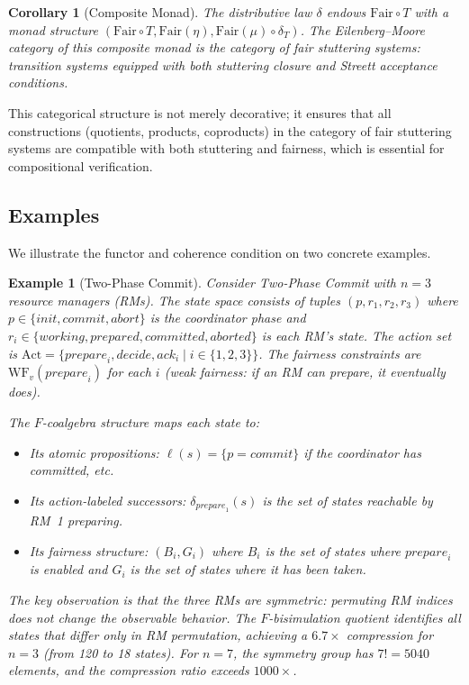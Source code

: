 \documentclass[11pt]{article}
\newtheorem{corollary}[theorem]{Corollary}
\newtheorem{example}[theorem]{Example}
\newcommand{\Fair}{\ensuremath{\mathrm{Fair}}}
\newcommand{\Act}{\ensuremath{\mathrm{Act}}}
\newcommand{\WF}{\ensuremath{\mathrm{WF}}}
\begin{document}
\begin{corollary}[Composite Monad]
\label{cor:composite}
The distributive law $\delta$ endows $\Fair \circ T$ with a monad structure
$(\Fair \circ T, \Fair(\eta), \Fair(\mu) \circ \delta_T)$.
The Eilenberg--Moore category of this composite monad is the category of
\emph{fair stuttering systems}: transition systems equipped with both
stuttering closure and Streett acceptance conditions.
\end{corollary}

This categorical structure is not merely decorative; it ensures that all
constructions (quotients, products, coproducts) in the category of fair
stuttering systems are compatible with both stuttering and fairness, which
is essential for compositional verification.


\subsection{Examples}

We illustrate the functor and coherence condition on two concrete examples.

\begin{example}[Two-Phase Commit]
\label{ex:2pc}
Consider Two-Phase Commit with $n = 3$ resource managers (RMs).
The state space consists of tuples $(p, r_1, r_2, r_3)$ where
$p \in \{\mathit{init}, \mathit{commit}, \mathit{abort}\}$ is the
coordinator phase and $r_i \in \{\mathit{working}, \mathit{prepared},
\mathit{committed}, \mathit{aborted}\}$ is each RM's state.
The action set is $\Act = \{\mathit{prepare}_i, \mathit{decide},
\mathit{ack}_i \mid i \in \{1,2,3\}\}$.
The fairness constraints are $\WF_v(\mathit{prepare}_i)$ for each $i$
(weak fairness: if an RM can prepare, it eventually does).

The $F$-coalgebra structure maps each state to:
\begin{itemize}[nosep]
\item Its atomic propositions: $\ell(s) = \{p = \mathit{commit}\}$ if the
  coordinator has committed, etc.
\item Its action-labeled successors: $\delta_{\mathit{prepare}_1}(s)$ is the
  set of states reachable by RM~1 preparing.
\item Its fairness structure: $(B_i, G_i)$ where $B_i$ is the set of states
  where $\mathit{prepare}_i$ is enabled and $G_i$ is the set of states
  where it has been taken.
\end{itemize}

The key observation is that the three RMs are \emph{symmetric}: permuting
RM indices does not change the observable behavior.
The $F$-bisimulation quotient identifies all states that differ only in
RM permutation, achieving a $6.7\times$ compression for $n = 3$
(from 120 to 18 states).
For $n = 7$, the symmetry group has $7! = 5040$ elements, and the
compression ratio exceeds $1000\times$.
\end{example}
\end{document}
